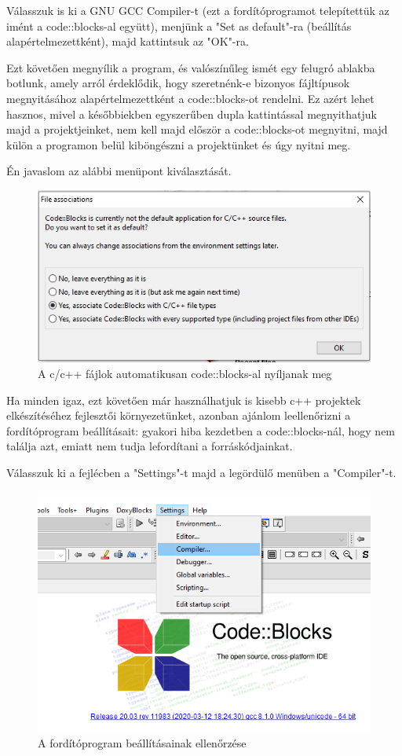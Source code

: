 Válasszuk is ki a GNU GCC Compiler-t (ezt a fordítóprogramot telepítettük az imént a code::blocks-al együtt), menjünk a "Set as default"-ra (beállítás alapértelmezettként), majd kattintsuk az "OK"-ra.

Ezt követően megnyílik a program, és valószínűleg ismét egy felugró ablakba botlunk, amely arról érdeklődik, hogy szeretnénk-e bizonyos fájltípusok megnyitásához alapértelmezettként a code::blocks-ot rendelni. Ez azért lehet hasznos, mivel a későbbiekben egyszerűben dupla kattintással megnyithatjuk majd a projektjeinket, nem kell majd először a code::blocks-ot megnyitni, majd külön a programon belül kiböngészni a projektünket és úgy nyitni meg.

Én javaslom az alábbi menüpont kiválasztását.

\begin{figure}[H]
	\centering
	\includegraphics[width=0.7\linewidth]{images/bevezetes/associate_code_blocks}
	\caption{A c/c++ fájlok automatikusan code::blocks-al nyíljanak meg}
	\label{fig:choose}
\end{figure}

Ha minden igaz, ezt követően már használhatjuk is kisebb c++ projektek elkészítéséhez fejlesztői környezetünket, azonban ajánlom leellenőrizni a fordítóprogram beállításait: gyakori hiba kezdetben a code::blocks-nál, hogy nem találja azt, emiatt nem tudja lefordítani a forráskódjainkat.

Válasszuk ki a fejlécben a "Settings"-t majd a legördülő menüben a "Compiler"-t.


\begin{figure}[H]
	\centering
	\includegraphics[width=0.7\linewidth]{images/bevezetes/check_compiler_01}
	\caption{A fordítóprogram beállításainak ellenőrzése}
	\label{fig:choose}
\end{figure}

